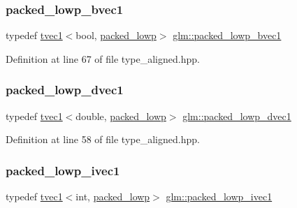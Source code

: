 \subsubsection{\texorpdfstring{packed\_lowp\_bvec1}{packed\_lowp\_bvec1}}
{\footnotesize\ttfamily typedef \mbox{\hyperlink{structglm_1_1tvec1}{tvec1}}$<$bool, \mbox{\hyperlink{namespaceglm_a0f04f086094c747d227af4425893f545ac36a4bd74559be2c0b65bc48e5953b8b}{packed\+\_\+lowp}}$>$ \mbox{\hyperlink{group__gtc__type__aligned_ga4b803db802aa82cc46d17120e786de1d}{glm\+::packed\+\_\+lowp\+\_\+bvec1}}}



Definition at line 67 of file type\+\_\+aligned.\+hpp.

\mbox{\label{group__gtc__type__aligned_ga6c11aa5a23fdd73f1981d306b3369f3f}} 
\subsubsection{\texorpdfstring{packed\_lowp\_dvec1}{packed\_lowp\_dvec1}}
{\footnotesize\ttfamily typedef \mbox{\hyperlink{structglm_1_1tvec1}{tvec1}}$<$double, \mbox{\hyperlink{namespaceglm_a0f04f086094c747d227af4425893f545ac36a4bd74559be2c0b65bc48e5953b8b}{packed\+\_\+lowp}}$>$ \mbox{\hyperlink{group__gtc__type__aligned_ga6c11aa5a23fdd73f1981d306b3369f3f}{glm\+::packed\+\_\+lowp\+\_\+dvec1}}}



Definition at line 58 of file type\+\_\+aligned.\+hpp.

\mbox{\label{group__gtc__type__aligned_ga4e0147efb3901f6459b7d2c80a1e23fd}} 
\subsubsection{\texorpdfstring{packed\_lowp\_ivec1}{packed\_lowp\_ivec1}}
{\footnotesize\ttfamily typedef \mbox{\hyperlink{structglm_1_1tvec1}{tvec1}}$<$int, \mbox{\hyperlink{namespaceglm_a0f04f086094c747d227af4425893f545ac36a4bd74559be2c0b65bc48e5953b8b}{packed\+\_\+lowp}}$>$ \mbox{\hyperlink{group__gtc__type__aligned_ga4e0147efb3901f6459b7d2c80a1e23fd}{glm\+::packed\+\_\+lowp\+\_\+ivec1}}}



